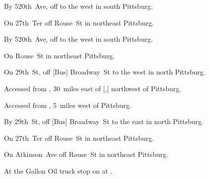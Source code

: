 

\begin{LocationList}

By 520th~Ave, off  to the west in south Pittsburg.

On 27th~Ter off Rouse~St in northeast Pittsburg.

By 520th~Ave, off  to the west in south Pittsburg.

On Rouse~St in northeast Pittsburg.

On 29th~St, off [Bus] Broadway~St to the west in north Pittsburg.

Accessed from , 30~miles east of [,] northwest of Pittsburg.

Accessed from , 5~miles west of Pittsburg.

By 29th~St, off [Bus] Broadway~St to the east in north Pittsburg.

On 27th~Ter off Rouse~St in northeast Pittsburg.

\Location{\TruckService \Service}
On Atkinson~Ave off Rouse~St in northeast Pittsburg.

At the Gallon Oil truck stop on  at .

\end{LocationList}
